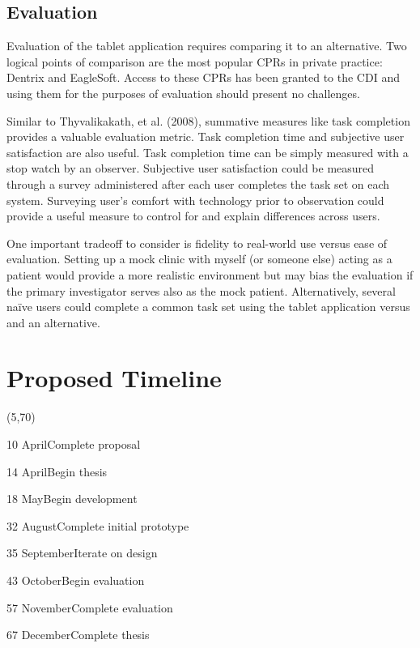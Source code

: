 \documentclass[11pt]{article}
\begin{document}
\subsection{Evaluation}

Evaluation of the tablet application requires comparing it to an alternative. Two logical points of comparison are the most popular CPRs in private practice: Dentrix and EagleSoft. Access to these CPRs has been granted to the CDI and using them for the purposes of evaluation should present no challenges.

Similar to Thyvalikakath, et al. (2008), summative measures like task completion provides a valuable evaluation metric. Task completion time and subjective user satisfaction are also useful. Task completion time can be simply measured with a stop watch by an observer. Subjective user satisfaction could be measured through a survey administered after each user completes the task set on each system. Surveying user's comfort with technology prior to observation could provide a useful measure to control for and explain differences across users.

One important tradeoff to consider is fidelity to real-world use versus ease of evaluation. Setting up a mock clinic with myself (or someone else) acting as a patient would provide a more realistic environment but may bias the evaluation if the primary investigator serves also as the mock patient. Alternatively, several na\"{i}ve users could complete a common task set using the tablet application versus and an alternative.

\section{Proposed Timeline}

\begin{timeline}{2in}(5,70)
\optrule
  \item[10]{April}{Complete proposal}
  \item[14]{April}{Begin thesis}
  \item[18]{May}{Begin development}
  \item[32]{August}{Complete initial prototype}
  \item[35]{September}{Iterate on design}
  \item[43]{October}{Begin evaluation}
  \item[57]{November}{Complete evaluation}
  \item[67]{December}{Complete thesis}
\end{timeline}%
\\
\\

\footnotesize{
}
\end{document}

